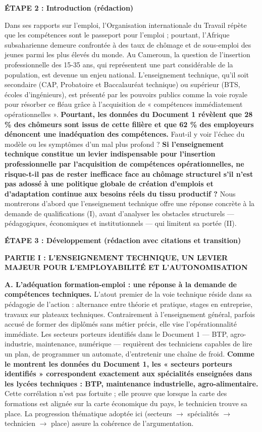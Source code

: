 \documentclass[11pt]{article}
\newcommand{\cle}[1]{{\popxbold\color{popdark}#1}}
\begin{document}
\begin{exoresolu}
\textbf{ÉTAPE 2 : Introduction (rédaction)}

Dans ses rapports sur l'emploi, l'Organisation internationale du Travail répète que les compétences sont le passeport pour l'emploi ; pourtant, l'Afrique subsaharienne demeure confrontée à des taux de chômage et de sous-emploi des jeunes parmi les plus élevés du monde. Au Cameroun, la question de l'insertion professionnelle des 15-35 ans, qui représentent une part considérable de la population, est devenue un enjeu national. L'enseignement technique, qu'il soit secondaire (CAP, Probatoire et Baccalauréat technique) ou supérieur (BTS, écoles d'ingénieurs), est présenté par les pouvoirs publics comme la \cle{voie royale} pour résorber ce fléau grâce à l'acquisition de « compétences immédiatement opérationnelles ». \textbf{Pourtant, les données du Document 1 révèlent que 28 \% des chômeurs sont issus de cette filière et que 62 \% des employeurs dénoncent une inadéquation des compétences.} Faut-il y voir l'échec du modèle ou les symptômes d'un mal plus profond ? \textbf{Si l'enseignement technique constitue un levier indispensable pour l'insertion professionnelle par l'acquisition de compétences opérationnelles, ne risque-t-il pas de rester inefficace face au chômage structurel s'il n'est pas adossé à une politique globale de création d'emplois et d'adaptation continue aux besoins réels du tissu productif ?} Nous montrerons d'abord que l'enseignement technique offre une réponse concrète à la demande de qualifications (I), avant d'analyser les obstacles structurels — pédagogiques, économiques et institutionnels — qui limitent sa portée (II).

\textbf{ÉTAPE 3 : Développement (rédaction avec citations et transition)}

\textbf{PARTIE I : L'ENSEIGNEMENT TECHNIQUE, UN LEVIER MAJEUR POUR L'EMPLOYABILITÉ ET L'AUTONOMISATION}

\textbf{A. L'adéquation formation-emploi : une réponse à la demande de compétences techniques.}
L'atout premier de la voie technique réside dans sa pédagogie de l'action : alternance entre théorie et pratique, stages en entreprise, travaux sur plateaux techniques. Contrairement à l'enseignement général, parfois accusé de former des diplômés sans métier précis, elle vise l'\cle{opérationnalité} immédiate. Les secteurs porteurs identifiés dans le Document 1 — BTP, agro-industrie, maintenance, numérique — requièrent des techniciens capables de lire un plan, de programmer un automate, d'entretenir une chaîne de froid. \textbf{Comme le montrent les données du Document 1, les « secteurs porteurs identifiés » correspondent exactement aux spécialités enseignées dans les lycées techniques : BTP, maintenance industrielle, agro-alimentaire.} Cette corrélation n'est pas fortuite ; elle prouve que lorsque la carte des formations est alignée sur la carte économique du pays, le technicien trouve sa place. La progression thématique adoptée ici (secteurs $\rightarrow$ spécialités $\rightarrow$ technicien $\rightarrow$ place) assure la cohérence de l'argumentation.


\end{exoresolu}
\end{document}
